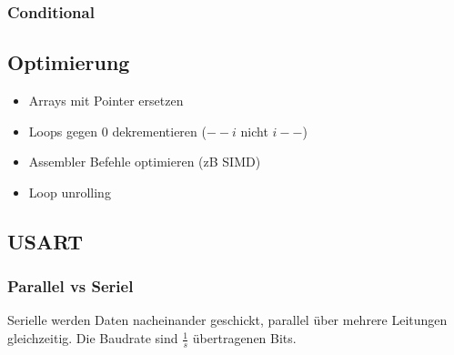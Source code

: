 \subsubsection{Conditional}

\begin{center}
\end{center}

\subsection{Optimierung}
\begin{itemize}[nosep]
	\item Arrays mit Pointer ersetzen
	\item Loops gegen 0 dekrementieren ($--i$ nicht $i--$)
	\item Assembler Befehle optimieren (zB SIMD)
	\item Loop unrolling
\end{itemize}

\subsection{USART}
\subsubsection{Parallel vs Seriel}
Serielle werden Daten nacheinander geschickt, parallel über mehrere Leitungen gleichzeitig. Die Baudrate sind $\frac{1}{s}$ übertragenen Bits.

